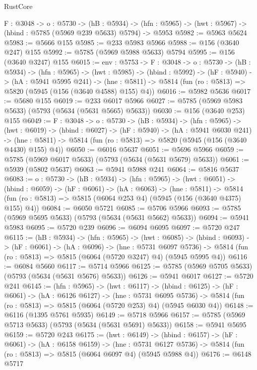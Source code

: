 \begin{lexlean}{RustCore}
\begin{coremodule}
  {F : @3048} ->
  {o : @5730} ->
  (hB : @5934) ->
  (hfn : @5965) -> (hwt : @5967) -> (hbind : @5785 (@5969 @239 @5633) @5794) -> @5953
@5982 := @5963 @5624
@5983 := @5666 @155
@5985 := @233 @5983 @5966
@5988 := @156 (@3640 @247) @155
@5992 := @5785 (@5969 @5988 @5633) @5794
@5995 := @156 (@3640 @3247) @155
@6015 := {env : @5753} ->
  {F : @3048} ->
  {o : @5730} ->
  (hB : @5934) ->
  (hfn : @5965) ->
  (hwt : @5985) ->
  (hbind : @5992) ->
  (hF : @5940) ->
  (hA : @5941 @5995 @241) ->
  (hne : @5811) -> @5814 (fun (ro : @5813) => @5820 (@5945 (@156 (@3640 @4588) @155) @4))
@6016 := @5982 @5636
@6017 := @5680 @155
@6019 := @233 @6017 @5966
@6027 := @5785 (@5969 @5983 @5633) (@5793 (@5634 (@5631 @5665) @5633))
@6030 := @156 (@3640 @253) @155
@6049 := {F : @3048} ->
  {o : @5730} ->
  (hB : @5934) ->
  (hfn : @5965) ->
  (hwt : @6019) ->
  (hbind : @6027) ->
  (hF : @5940) ->
  (hA : @5941 @6030 @241) ->
  (hne : @5811) -> @5814 (fun (ro : @5813) => @5820 (@5945 (@156 (@3640 @4430) @155) @4))
@6050 := @6016 @5637
@6051 := @5696 @5966
@6059 := @5785 (@5969 @6017 @5633) (@5793 (@5634 (@5631 @5679) @5633))
@6061 := @5939 (@5802 @5637)
@6063 := @5941 @5988 @241
@6064 := @5816 @5637
@6083 := {o : @5730} ->
  (hB : @5934) ->
  (hfn : @5965) ->
  (hwt : @6051) ->
  (hbind : @6059) ->
  (hF : @6061) ->
  (hA : @6063) ->
  (hne : @5811) ->
  @5814 (fun (ro : @5813) => @5815 (@6064 @253 @4) (@5945 (@156 (@3640 @4375) @155) @4))
@6084 := @6050 @5721
@6085 := @5706 @5966
@6093 := @5785 (@5969 @5695 @5633) (@5793 (@5634 (@5631 @5662) @5633))
@6094 := @5941 @5983
@6095 := @5720 @239
@6096 := @6094 @6095
@6097 := @5720 @247
@6115 := (hB : @5934) ->
  (hfn : @5965) ->
  (hwt : @6085) ->
  (hbind : @6093) ->
  (hF : @6061) ->
  (hA : @6096) ->
  (hne : @5731 @6097 @5736) ->
  @5814 (fun (ro : @5813) => @5815 (@6064 (@5720 @3247) @4) (@5945 @5995 @4))
@6116 := @6084 @5660
@6117 := @5714 @5966
@6125 := @5785 (@5969 @5705 @5633) (@5793 (@5634 (@5631 @5676) @5633))
@6126 := @5941 @6017
@6127 := @5720 @241
@6145 := (hfn : @5965) ->
  (hwt : @6117) ->
  (hbind : @6125) ->
  (hF : @6061) ->
  (hA : @6126 @6127) ->
  (hne : @5731 @6095 @5736) ->
  @5814 (fun (ro : @5813) => @5815 (@6064 (@5720 @253) @4) (@5945 @6030 @4))
@6148 := @6116 (@1395 @5761 @5935)
@6149 := @5718 @5966
@6157 := @5785 (@5969 @5713 @5633) (@5793 (@5634 (@5631 @5691) @5633))
@6158 := @5941 @5695
@6159 := @5720 @243
@6175 := (hwt : @6149) ->
  (hbind : @6157) ->
  (hF : @6061) ->
  (hA : @6158 @6159) ->
  (hne : @5731 @6127 @5736) -> @5814 (fun (ro : @5813) => @5815 (@6064 @6097 @4) (@5945 @5988 @4))
@6176 := @6148 @5717

\end{coremodule}
\end{lexlean}
